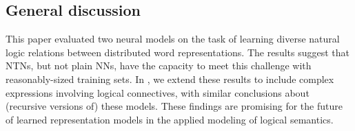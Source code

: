 \subsection*{General discussion}\label{sec:discussion}

This paper evaluated two neural models on the task of learning diverse
natural logic relations between distributed word representations. The
results suggest that NTNs, but not plain NNs, have the capacity to
meet this challenge with reasonably-sized training sets. In
\cite{Bowman:Potts:Manning:2014}, we extend these results to include
complex expressions involving logical connectives, with similar
conclusions about (recursive versions of) these models. These findings
are promising for the future of learned representation models in the
applied modeling of logical semantics.

%
%
%


